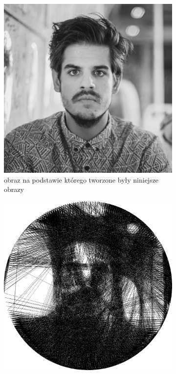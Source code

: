 \documentclass[a4paper, 12pt, polish, twoside]{extreport}
\begin{document}
    
    \begin{figure}[H] 
    \centering
    \begin{subfigure}{0.32\textwidth}
        \centering
        \includegraphics[width = \textwidth]{img/4-mine/taco-mask/taco-grey.png}
        \caption{obraz na podstawie którego tworzone były niniejsze obrazy}
        \label{mine-param-taco-thread-a}
    \end{subfigure}
    \begin{subfigure}{0.32\textwidth}
        \centering
        \includegraphics[width = \textwidth]{img/4-mine/taco-thread/taco_e_i3000_c20_inv0_bg1_obj1_ed1.png}

\end{subfigure}
\end{figure}
\end{document}
